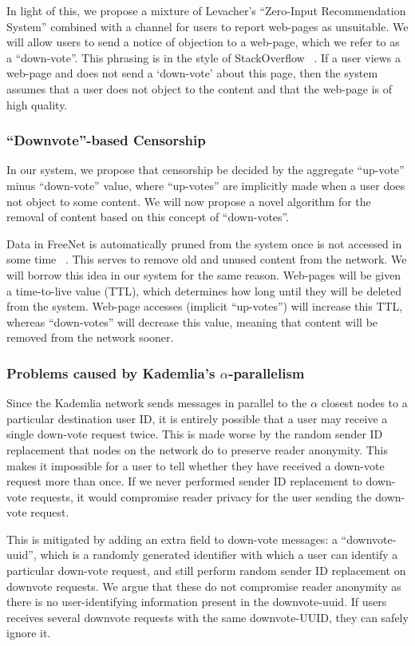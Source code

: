 In light of this, we propose a mixture of Levacher's ``Zero-Input Recommendation System'' combined with a channel for users to
report web-pages as unsuitable.
We will allow users to send a notice of objection to a web-page, which we refer to as a ``down-vote''. This phrasing is in the
style of StackOverflow ~\cite{stackoverflow}. If a user views a web-page and does not send a `down-vote' about this page, then the
system assumes that a user does not object to the content and that the web-page is of high quality.

\subsubsection{``Downvote''-based Censorship}

In our system, we propose that censorship be decided by the aggregate ``up-vote'' minus ``down-vote'' value,
where ``up-votes'' are implicitly made when a user does not object to some content.
We will now propose a novel algorithm for the removal of content based on this concept of ``down-votes''.

Data in FreeNet is automatically pruned from the system once is not accessed in some time ~\cite{freenet}.
This serves to remove old and unused content from the network. We will borrow this idea in our system for
the same reason. Web-pages will be given a time-to-live value (TTL), which determines how long until they will
be deleted from the system. Web-page accesses (implicit ``up-votes'') will increase this
TTL, whereas ``down-votes'' will decrease this value, meaning that content will be removed from the network sooner.

\subsubsection{Problems caused by Kademlia's $\alpha$-parallelism}

Since the Kademlia network sends messages in parallel to the $\alpha$ closest nodes to a particular destination user ID,
it is entirely possible that a user may receive a single down-vote request twice. This is made worse by the
random sender ID replacement that nodes on the network do to preserve reader anonymity.
This makes it impossible for a user to tell whether they have received a down-vote request more than once.
If we never performed sender ID replacement to down-vote requests, it would compromise reader privacy for the user
sending the down-vote request.

This is mitigated by adding an extra field to down-vote messages: a ``downvote-uuid'', which is a randomly generated
identifier with which a user can identify a particular down-vote request, and still perform random sender ID
replacement on downvote requests. We argue that these do not compromise reader anonymity as there is no
user-identifying information present in the downvote-uuid. If users receives several downvote requests
with the same downvote-UUID, they can safely ignore it.

